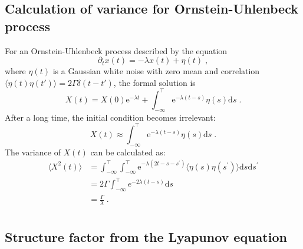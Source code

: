 \documentclass{article}
\begin{document}
\subsection{Calculation of variance for Ornstein-Uhlenbeck process\label{appendix:OUvariance}}

For an Ornstein-Uhlenbeck process described by the equation 
\begin{equation}
    \partial_t x(t) = -\lambda x(t) + \eta(t)\;,
\end{equation}
where $\eta(t)$ is a Gaussian white noise with zero mean and correlation $\langle \eta(t)\eta(t')\rangle = 2\Gamma\delta(t-t')$, the formal solution is 
\begin{equation}
    X\left( t \right) =X\left( 0 \right) \mathrm{e}^{-\lambda t}+\int_{-\infty}^{\top}{\mathrm{e}^{-\lambda \left( t-s \right)}\eta \left( s \right) \mathrm{d}s }\;.
\end{equation}
After a long time, the initial condition becomes irrelevant:
\begin{equation}
    X\left( t \right) \approx \int_{-\infty}^{\top}{\mathrm{e}^{-\lambda \left( t-s \right)}\eta \left( s \right) \mathrm{d}s }\;.
\end{equation}
The variance of $X(t)$ can be calculated as:
\begin{equation}
    \begin{aligned}
        \langle X^2(t)\rangle &=\int_{-\infty}^{\top}{\int_{-\infty}^{\top}{\mathrm{e}^{-\lambda (2t-s-s^{\prime})}\langle \eta (s)\eta (s^{\prime})\rangle \mathrm{d}s\mathrm{d}s^{\prime}}}\\
        &=2\Gamma \int_{-\infty}^{\top}{e^{-2\lambda (t-s)}\mathrm{d}s}\\
        &=\frac{\Gamma}{\lambda}\;.\\
    \end{aligned}
\end{equation}

\subsection{Structure factor from the Lyapunov equation}
\label{appendix:LyapunovSk}
\end{document}
